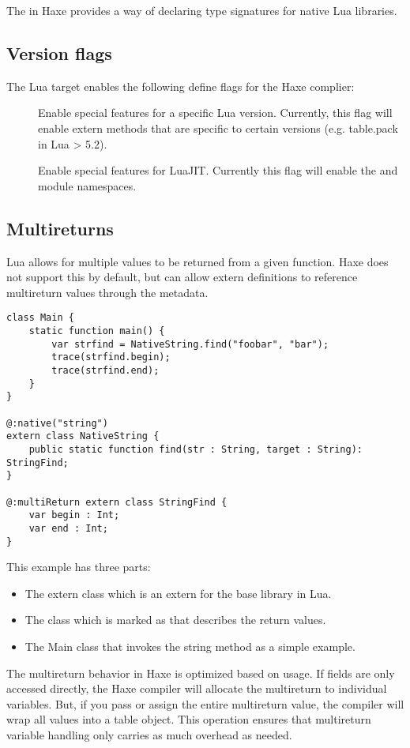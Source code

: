 The  in Haxe provides a way of declaring type signatures
for native Lua libraries.

\subsection{Version flags}
\label{target-lua-flags}

The Lua target enables the following define flags for the Haxe complier:

\begin{description}
	\item[] Enable special features for a specific Lua version. Currently, this flag will enable extern methods that are specific to certain versions (e.g. table.pack in Lua > 5.2).
	\item[] Enable special features for LuaJIT.  Currently this flag will enable the  and  module namespaces.
\end{description}

\subsection{Multireturns}
\label{target-lua-multireturns}

Lua allows for multiple values to be returned from a given function.  Haxe
does not support this by default, but can allow extern definitions to reference
multireturn values through the  metadata.

\begin{lstlisting}
class Main {
    static function main() {
        var strfind = NativeString.find("foobar", "bar");
        trace(strfind.begin);
        trace(strfind.end);
    }
}

@:native("string")
extern class NativeString {
	public static function find(str : String, target : String): StringFind;
}

@:multiReturn extern class StringFind {
	var begin : Int;
	var end : Int;
}
\end{lstlisting}

This example has three parts:

\begin{itemize}
	\item The extern class  which is an extern for the base  library in Lua.
	\item The  class which is marked as  that describes the return values.
	\item The Main class that invokes the string method as a simple example.
\end{itemize}

The multireturn behavior in Haxe is optimized based on usage.  If fields are
only accessed directly, the Haxe compiler will allocate the multireturn to
individual variables.  But, if you pass or assign the entire multireturn value,
the compiler will wrap all values into a table object.  This operation ensures
that multireturn variable handling only carries as much overhead as needed.


